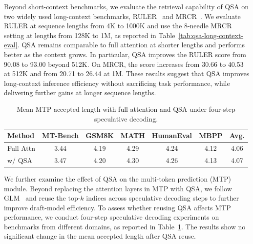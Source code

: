 Beyond short-context benchmarks, we evaluate the retrieval capability of QSA on two widely used long-context benchmarks, RULER~\citep{hsieh2024ruler} and MRCR~\citep{openai2025mrcr}.
We evaluate RULER at sequence lengths from 4K to 1000K and use the 8-needle MRCR setting at lengths from 128K to 1M, as reported in Table~\ref{tab:qsa-long-context-eval}.
QSA remains comparable to full attention at shorter lengths and performs better as the context grows.
In particular, QSA improves the RULER score from 90.08 to 93.00 beyond 512K. On MRCR, the score increases from 30.66 to 40.53 at 512K and from 20.71 to 26.44 at 1M.
These results suggest that QSA improves long-context inference efficiency without sacrificing task performance,
while delivering further gains at longer sequence lengths.


\begin{table}[h]
\centering
\small
\caption{Mean MTP accepted length with full attention and QSA under four-step speculative decoding.}
\label{tab:qsa-mtp-eval}
\setlength{\tabcolsep}{4pt}
\begin{tabular}{l cccccc}
\toprule
Method & MT-Bench & GSM8K & MATH
& HumanEval & MBPP & Avg. \\
\midrule
Full Attn & 3.44 & 4.19 & 4.29 & 4.24 & 4.12 & 4.06 \\
w/ QSA & 3.47 & 4.20 & 4.30 & 4.26 & 4.13 & 4.07 \\
\bottomrule
\end{tabular}
\end{table}
We further examine the effect of QSA on the multi-token prediction (MTP) module.
Beyond replacing the attention layers in MTP with QSA, we follow GLM~\citep{glm5team2026glm5vibecodingagentic}
and reuse the top-$k$ indices across speculative decoding steps to further improve draft-model efficiency.
To assess whether reusing QSA affects MTP performance, we conduct four-step speculative decoding experiments on benchmarks from different domains, as reported in Table~\ref{tab:qsa-mtp-eval}. 
The results show no significant change in the mean accepted length after QSA reuse.



